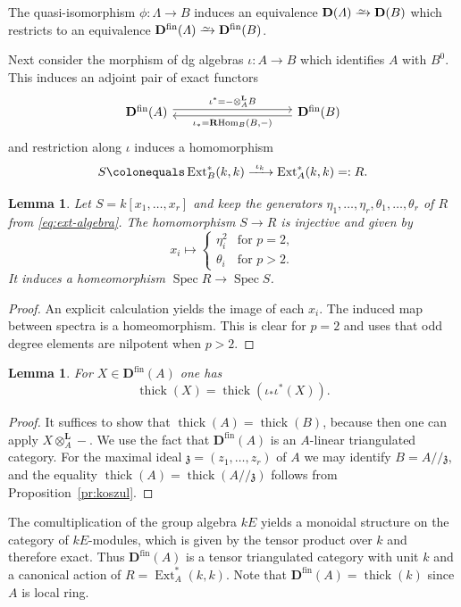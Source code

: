 \documentclass{amsart}[a4]
\newtheorem{lemma}[theorem]{Lemma}
\theoremstyle{definition}
\theoremstyle{remark}
\numberwithin{equation}{section}
\newcommand{\Ext}{\operatorname{Ext}}
\newcommand{\RHom}{\operatorname{{\mathbf R}Hom}}
\newcommand{\Spec}{\operatorname{Spec}}
\newcommand{\thick}{\operatorname{thick}}
\newcommand{\iso}{\xrightarrow{\raisebox{-.6ex}[0ex][0ex]{$\scriptstyle{\sim}$}}}
\newcommand{\kos}[2]{{#1}/\!\!/{#2}}
\newcommand{\lotimes}{\otimes^{\mathbf L}}
\newcommand{\fin}{\mathrm{fin}}
\newcommand{\bfD}{\mathbf D}
\newcommand{\fz}{\mathfrak{z}}
\let\Lambda\varLambda
\begin{document}
The quasi-isomorphism $\phi\colon\Lambda\to B$ induces an equivalence
$\bfD(\Lambda)\iso\bfD(B)$ which restricts to an equivalence
$\bfD^\fin(\Lambda)\iso\bfD^\fin(B)$.


Next consider the morphism of dg algebras
$\iota\colon A\to B$ which identifies $A$ with $B^0$. This induces an adjoint pair of
exact functors
\begin{equation*}
\begin{tikzcd}[column sep = huge]
\bfD^\fin(A) \ar[rr,yshift=2.5,"\iota^*=-\lotimes_A B"] &&  \ar[ll,yshift=-2.5,"{\iota_*=\RHom_B(B,-)}"]
\bfD^\fin(B)
\end{tikzcd}
\end{equation*}
and restriction along $\iota$ induces a homomorphism
\[ S\colonequals\Ext^*_B(k,k)\xrightarrow{\ \iota_k\ } \Ext^*_A(k,k)=:R.\]

\begin{lemma}\label{le:ext-alg-homeom}
Let $S=k[x_1,\ldots,x_r]$ and keep the generators $\eta_1,\ldots,\eta_r,\theta_1,\ldots,\theta_r$ of $R$
from \eqref{eq:ext-algebra}. The homomorphism $S\to R$ is
injective and given by \[ x_i\longmapsto \begin{cases} \eta_i^2&\text{for }p=2,\\
    \theta_i&\text{for }p>2.
  \end{cases}\] It induces a homeomorphism $\Spec R\to\Spec S$.
\end{lemma}
\begin{proof}
An explicit calculation yields the image of each $x_i$. The induced
map between spectra is a homeomorphism. This is clear for $p=2$ and
uses that odd degree elements are
nilpotent when $p>2$.
\end{proof}

\begin{lemma}\label{le:thick-ind-res}
  For $X\in \bfD^\fin(A)$ one has \[\thick(X)=\thick(\iota_*\iota^*(X)).\]
\end{lemma}
\begin{proof}
  It suffices to show that $\thick(A)=\thick(B)$, because then one can
  apply $X\lotimes_A-$. We use the fact that $\bfD^\fin(A)$ is an
  $A$-linear triangulated category.  For the maximal ideal
  $\fz=(z_1,\ldots,z_r)$ of $A$ we may identify $B=\kos{A}{\fz}$,
 and the equality $\thick(A)=\thick(\kos{A}{\fz})$ follows from
  Proposition~\ref{pr:koszul}.
\end{proof}

The comultiplication of the group algebra $kE$ yields a monoidal
structure on the category of $kE$-modules, which is given by the
tensor product over $k$ and therefore exact. Thus $\bfD^\fin(A)$ is a
tensor triangulated category with unit $k$ and a canonical action of
$R=\Ext_{A}^*(k,k)$. Note that $\bfD^\fin(A)=\thick(k)$ since $A$ is
local ring.
\end{document}
